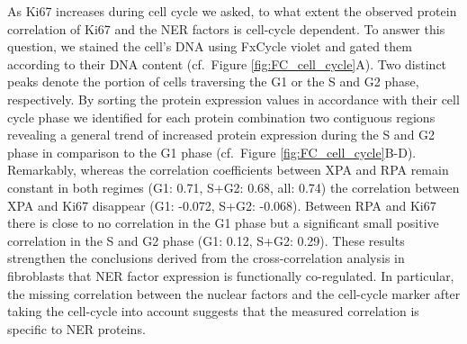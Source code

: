 As Ki67 increases during cell cycle we asked, to what extent the observed protein correlation of Ki67 and the NER factors is cell-cycle dependent. To answer this question, we stained the cell's DNA using FxCycle violet and gated them according to their DNA content (cf.\ Figure \ref{fig:FC_cell_cycle}A). Two distinct peaks denote the portion of cells traversing the G1 or the S and G2 phase, respectively. By sorting the protein expression values in accordance with their cell cycle phase we identified for each protein combination two contiguous regions revealing a general trend of increased protein expression during the S and G2 phase in comparison to the G1 phase (cf.\ Figure \ref{fig:FC_cell_cycle}B-D).\\
Remarkably, whereas the correlation coefficients between XPA and RPA remain constant in both regimes (G1: 0.71, S+G2: 0.68, all: 0.74) the correlation between XPA and Ki67 disappear (G1: -0.072, S+G2: -0.068). Between RPA and Ki67 there is close to no correlation in the G1 phase but a significant small positive correlation in the S and G2 phase (G1: 0.12, S+G2: 0.29). These results strengthen the conclusions derived from the cross-correlation analysis in fibroblasts that NER factor expression is functionally co-regulated. In particular, the missing correlation between the nuclear factors and the cell-cycle marker after taking the cell-cycle into account suggests that the measured correlation is specific to NER proteins. 





